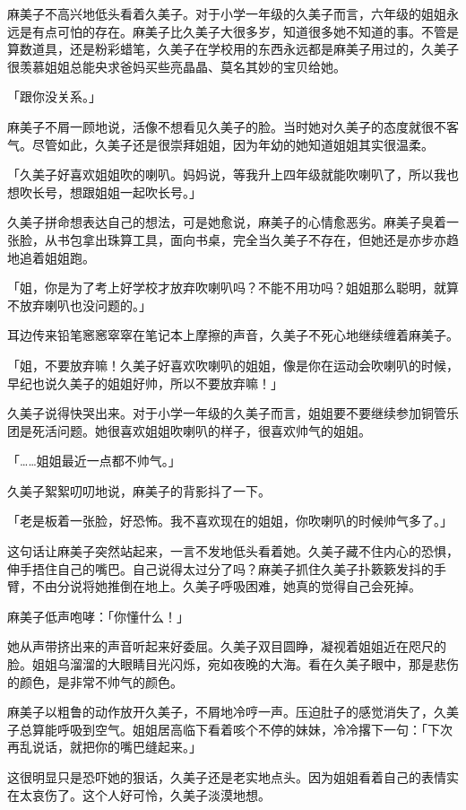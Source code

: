 \documentclass[UTF8]{ctexart}
\begin{document}
    麻美子不高兴地低头看着久美子。对于小学一年级的久美子而言，六年级的姐姐永远是有点可怕的存在。麻美子比久美子大很多岁，知道很多她不知道的事。不管是算数道具，还是粉彩蜡笔，久美子在学校用的东西永远都是麻美子用过的，久美子很羡慕姐姐总能央求爸妈买些亮晶晶、莫名其妙的宝贝给她。 

    「跟你没关系。」 

    麻美子不屑一顾地说，活像不想看见久美子的脸。当时她对久美子的态度就很不客气。尽管如此，久美子还是很崇拜姐姐，因为年幼的她知道姐姐其实很温柔。 

    「久美子好喜欢姐姐吹的喇叭。妈妈说，等我升上四年级就能吹喇叭了，所以我也想吹长号，想跟姐姐一起吹长号。」 

    久美子拼命想表达自己的想法，可是她愈说，麻美子的心情愈恶劣。麻美子臭着一张脸，从书包拿出珠算工具，面向书桌，完全当久美子不存在，但她还是亦步亦趋地追着姐姐跑。 

    「姐，你是为了考上好学校才放弃吹喇叭吗？不能不用功吗？姐姐那么聪明，就算不放弃喇叭也没问题的。」 

    耳边传来铅笔窸窸窣窣在笔记本上摩擦的声音，久美子不死心地继续缠着麻美子。 

    「姐，不要放弃嘛！久美子好喜欢吹喇叭的姐姐，像是你在运动会吹喇叭的时候，早纪也说久美子的姐姐好帅，所以不要放弃嘛！」 

    久美子说得快哭出来。对于小学一年级的久美子而言，姐姐要不要继续参加铜管乐团是死活问题。她很喜欢姐姐吹喇叭的样子，很喜欢帅气的姐姐。 

    「……姐姐最近一点都不帅气。」 

    久美子絮絮叨叨地说，麻美子的背影抖了一下。 

    「老是板着一张脸，好恐怖。我不喜欢现在的姐姐，你吹喇叭的时候帅气多了。」 

    这句话让麻美子突然站起来，一言不发地低头看着她。久美子藏不住内心的恐惧，伸手捂住自己的嘴巴。自己说得太过分了吗？麻美子抓住久美子扑簌簌发抖的手臂，不由分说将她推倒在地上。久美子呼吸困难，她真的觉得自己会死掉。 

    麻美子低声咆哮：「你懂什么！」 

    她从声带挤出来的声音听起来好委屈。久美子双目圆睁，凝视着姐姐近在咫尺的脸。姐姐乌溜溜的大眼睛目光闪烁，宛如夜晚的大海。看在久美子眼中，那是悲伤的颜色，是非常不帅气的颜色。 

    麻美子以粗鲁的动作放开久美子，不屑地冷哼一声。压迫肚子的感觉消失了，久美子总算能呼吸到空气。姐姐居高临下看着咳个不停的妹妹，冷冷撂下一句：「下次再乱说话，就把你的嘴巴缝起来。」 

    这很明显只是恐吓她的狠话，久美子还是老实地点头。因为姐姐看着自己的表情实在太哀伤了。这个人好可怜，久美子淡漠地想。 
\end{document}
